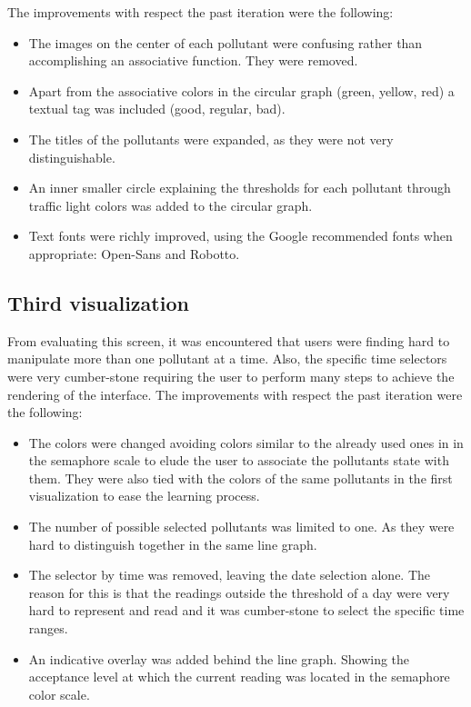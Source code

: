 The improvements with respect the past iteration were the following:
\begin{itemize}
	\item The images on the center of each pollutant were confusing rather than accomplishing an associative function. They were removed.
    \item Apart from the associative colors in the circular graph (green, yellow, red) a textual tag was included (good, regular, bad).
    \item The titles of the pollutants were expanded, as they were not very distinguishable. 
    \item An inner smaller circle explaining the thresholds for each pollutant through traffic light colors was added to the circular graph. 
    \item Text fonts were richly improved, using the Google recommended fonts when appropriate:  Open-Sans and Robotto.
	
\end{itemize}

\subsection{Third visualization}
From evaluating this screen, it was encountered that users were finding hard to manipulate more than one pollutant at a time. Also, the specific time selectors were very cumber-stone requiring the user to perform many steps to achieve the rendering of the interface. 
The improvements with respect the past iteration were the following:
\begin{itemize}
	\item The colors were changed avoiding colors similar to the already used ones in in the semaphore scale to elude the user to associate the pollutants state with them. They were also tied with the colors of the same pollutants in the first visualization to ease the learning process.
	\item The number of possible selected pollutants was limited to one. As they were hard to distinguish together in the same line graph. 
    \item The selector by time was removed, leaving the date selection alone. The reason for this is that the readings outside the threshold of a day were very hard to represent and read and it was cumber-stone to select the specific time ranges. 
    \item An indicative overlay was added behind the line graph. Showing the acceptance level at which the current reading was located in the semaphore color scale. 

\end{itemize}

